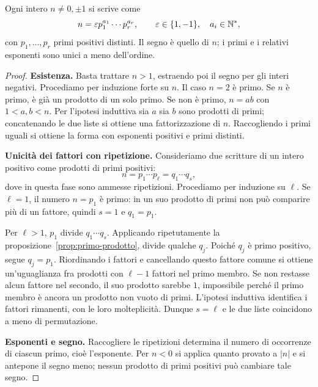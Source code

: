 \begin{teorema}\label{teo:fattorizzazione}
Ogni intero $n\ne0,\pm1$ si scrive come
\[
n=\varepsilon p_1^{a_1}\cdots p_r^{a_r},
\qquad \varepsilon\in\{1,-1\},\quad a_i\in\mathbb{N}^*,
\]
con $p_1,\ldots,p_r$ primi positivi distinti. Il segno è quello di $n$; i primi e i relativi esponenti sono unici a meno dell'ordine.
\end{teorema}
\begin{proof}
\textbf{Esistenza.} Basta trattare $n>1$, estraendo poi il segno per gli interi negativi. Procediamo per induzione forte su $n$. Il caso $n=2$ è primo. Se $n$ è primo, è già un prodotto di un solo primo. Se non è primo, $n=ab$ con $1<a,b<n$. Per l'ipotesi induttiva sia $a$ sia $b$ sono prodotti di primi; concatenando le due liste si ottiene una fattorizzazione di $n$. Raccogliendo i primi uguali si ottiene la forma con esponenti positivi e primi distinti.

\textbf{Unicità dei fattori con ripetizione.} Consideriamo due scritture di un intero positivo come prodotti di primi positivi:
\[
n=p_1\cdots p_\ell=q_1\cdots q_s,
\]
dove in questa fase sono ammesse ripetizioni. Procediamo per induzione su $\ell$. Se $\ell=1$, il numero $n=p_1$ è primo: in un suo prodotto di primi non può comparire più di un fattore, quindi $s=1$ e $q_1=p_1$.

Per $\ell>1$, $p_1$ divide $q_1\cdots q_s$. Applicando ripetutamente la proposizione~\ref{prop:primo-prodotto}, divide qualche $q_j$. Poiché $q_j$ è primo positivo, segue $q_j=p_1$. Riordinando i fattori e cancellando questo fattore comune si ottiene un'uguaglianza fra prodotti con $\ell-1$ fattori nel primo membro. Se non restasse alcun fattore nel secondo, il suo prodotto sarebbe $1$, impossibile perché il primo membro è ancora un prodotto non vuoto di primi. L'ipotesi induttiva identifica i fattori rimanenti, con le loro molteplicità. Dunque $s=\ell$ e le due liste coincidono a meno di permutazione.

\textbf{Esponenti e segno.} Raccogliere le ripetizioni determina il numero di occorrenze di ciascun primo, cioè l'esponente. Per $n<0$ si applica quanto provato a $|n|$ e si antepone il segno meno; nessun prodotto di primi positivi può cambiare tale segno.
\end{proof}

